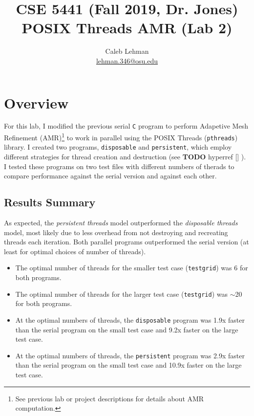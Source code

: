 \documentclass{article}
\title{
CSE 5441 (Fall 2019, Dr. Jones)\\
\large POSIX Threads AMR (Lab 2)
}
\author{
Caleb Lehman \\
\href{mailto:lehman.346@osu.edu}{lehman.346@osu.edu}
}
\begin{document}
\maketitle

\section*{Overview}
\label{sec:overview}

For this lab, I modified the previous serial \texttt{C} program to perform
Adapetive Mesh Refinement (AMR)\footnote{See previous lab or project
descriptions for details about AMR computation.} to work in parallel using the
POSIX Threads (\texttt{pthreads}) library. I created two programs,
\texttt{disposable} and \texttt{persistent}, which employ different strategies
for thread creation and destruction (see \textbf{TODO} hyperref [] {}). I
tested these programs on two test files with different numbers of therads to
compare performance against the serial version and against each other.

\subsection*{Results Summary}
\label{subsec:results-summary}

As expected, the \emph{persistent threads} model outperformed the
\emph{disposable threads} model, most likely due to less overhead from not
destroying and recreating threads each iteration. Both parallel programs
outperformed the serial version (at least for optimal choices of number of
threads).

\begin{itemize}

    \item The optimal number of threads for the smaller test case
    (\texttt{testgrid}) was 6 for both
    programs.

    \item The optimal number of threads for the larger test case
    (\texttt{testgrid}) was $\sim$20
    for both programs.
    
    \item At the optimal numbers of threads, the \texttt{disposable} program
    was 1.9x faster than the serial program on the small test case and 9.2x
    faster on the large test case.

    \item At the optimal numbers of threads, the \texttt{persistent} program
    was 2.9x faster than the serial program on the small test case and 10.9x
    faster on the large test case.

\end{itemize}
\end{document}
